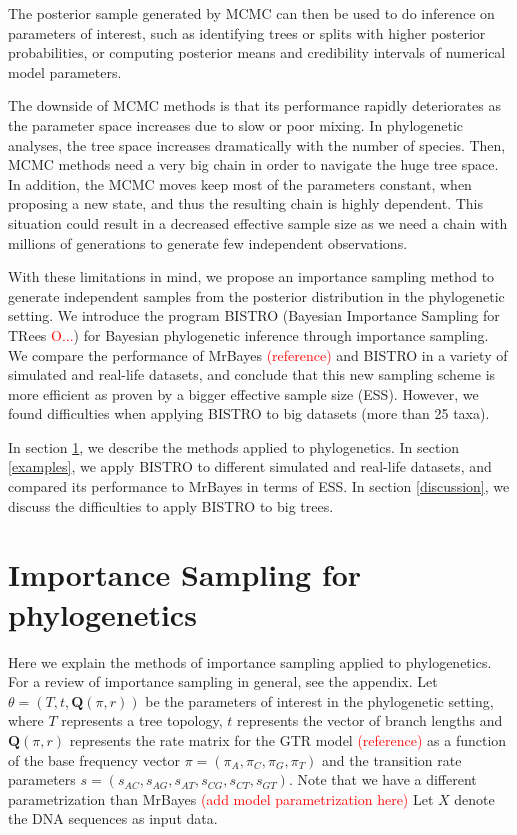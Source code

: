 \documentclass[useAMS,usenatbib]{biom}
\newcommand{\falta}[1]{\textcolor{red}{#1}}
\begin{document}
The posterior sample generated by MCMC can then be used to do
inference on parameters of interest, such as identifying trees or
splits with higher posterior probabilities, or computing posterior
means and credibility intervals of numerical model parameters.

The downside of MCMC methods is that its performance rapidly
deteriorates as the parameter space increases due to slow or poor
mixing. In phylogenetic analyses, the tree space increases
dramatically with the number of species. Then, MCMC methods need a
very big chain in order to navigate the huge tree space. In addition,
the MCMC moves keep most of the parameters constant, when proposing a
new state, and thus the resulting chain is highly dependent. This
situation could result in a decreased effective sample size as we need
a chain with millions of generations to generate few independent
observations.

With these limitations in mind, we propose an importance sampling
method to generate independent samples from the posterior distribution
in the phylogenetic setting. We introduce the program BISTRO (Bayesian
Importance Sampling for TRees \falta{O...}) for Bayesian phylogenetic
inference through importance sampling. We compare the performance of
MrBayes \falta{(reference)} and BISTRO in a variety of simulated and
real-life datasets, and conclude that this new sampling scheme is more
efficient as proven by a bigger effective sample size (ESS). However,
we found difficulties when applying BISTRO to big datasets (more than
25 taxa).

In section \ref{phyloIS}, we describe the methods applied to
phylogenetics. In section \ref{examples}, we apply BISTRO to different
simulated and real-life datasets, and compared its performance to
MrBayes in terms of ESS. In section \ref{discussion}, we discuss the
difficulties to apply BISTRO to big trees.



\section[]{Importance Sampling for phylogenetics}
\label{phyloIS}
Here we explain the methods of importance sampling applied to
phylogenetics. For a review of importance sampling in general, see the
appendix.  Let $\theta = (T, t, \mathbf{Q}(\pi,r))$ be the parameters
of interest in the phylogenetic setting, where $T$ represents a tree
topology, $t$ represents the vector of branch lengths and
$\mathbf{Q}(\pi,r)$ represents the rate matrix for the GTR model
\falta{(reference)} as a function of the base frequency vector $\pi =
(\pi_A, \pi_C, \pi_G, \pi_T)$ and the transition rate parameters $s =
(s_{AC}, s_{AG}, s_{AT}, s_{CG}, s_{CT}, s_{GT})$. Note that we have a
different parametrization than MrBayes \falta{(add model
  parametrization here)} Let $X$ denote the DNA sequences as input
data.
\end{document}
